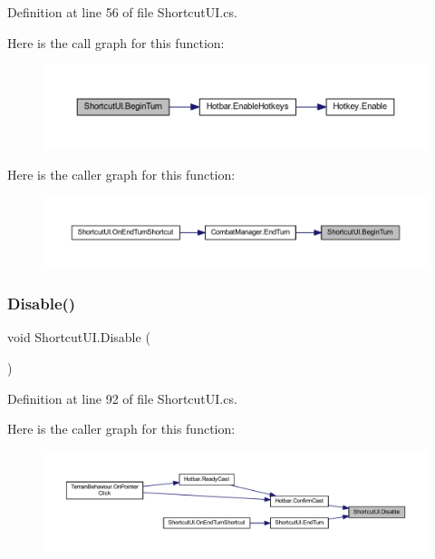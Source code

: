 Definition at line 56 of file Shortcut\+U\+I.\+cs.

Here is the call graph for this function\+:
\nopagebreak
\begin{figure}[H]
\begin{center}
\leavevmode
\includegraphics[width=350pt]{class_shortcut_u_i_af20cdb51997f4ae7219a36a7bca851a3_cgraph}
\end{center}
\end{figure}
Here is the caller graph for this function\+:
\nopagebreak
\begin{figure}[H]
\begin{center}
\leavevmode
\includegraphics[width=350pt]{class_shortcut_u_i_af20cdb51997f4ae7219a36a7bca851a3_icgraph}
\end{center}
\end{figure}
\mbox{\label{class_shortcut_u_i_a00f6fd2d64d2e5e978b749eafbe8f949}} 
\subsubsection{\texorpdfstring{Disable()}{Disable()}}
{\footnotesize\ttfamily void Shortcut\+U\+I.\+Disable (\begin{DoxyParamCaption}{ }\end{DoxyParamCaption})}



Definition at line 92 of file Shortcut\+U\+I.\+cs.

Here is the caller graph for this function\+:
\nopagebreak
\begin{figure}[H]
\begin{center}
\leavevmode
\includegraphics[width=350pt]{class_shortcut_u_i_a00f6fd2d64d2e5e978b749eafbe8f949_icgraph}
\end{center}
\end{figure}
\mbox{\label{class_shortcut_u_i_ae39ab7b830aff78693a4ddbaa3c59c3e}} 
